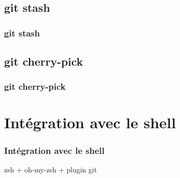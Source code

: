 \documentclass[t,11pt]{beamer}
\begin{document}
\subsection{git stash}
\begin{frame}
        \frametitle{git stash}
\end{frame}

\subsection{git cherry-pick}
\begin{frame}
        \frametitle{git cherry-pick}
\end{frame}

\section{Int\'egration avec le shell}
\begin{frame}
        \frametitle{Int\'egration avec le shell}
        zsh + oh-my-zsh + plugin git
\end{frame}
\end{document}
